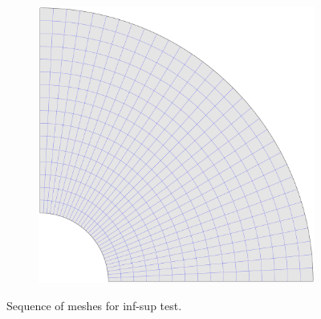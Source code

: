 \documentclass{article}
\begin{document}
\begin{figure}
\begin{subfigure}[b]{0.18\linewidth}
    \end{subfigure}
    \begin{subfigure}[b]{0.18\linewidth}        %
        \centering
        \includegraphics[width=\linewidth]{mesh_hole_4}
    \end{subfigure}
    \caption{Sequence of meshes for inf-sup test.}
    \label{fig:mesh_hole}
\end{figure}
\end{document}

